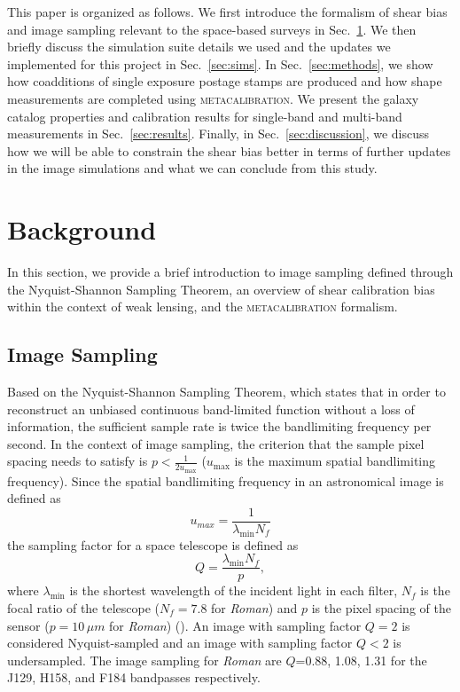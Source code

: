 \documentclass[fleqn,usenatbib]{mnras}
\begin{document}
This paper is organized as follows. We first introduce the formalism of shear bias and image sampling relevant to the space-based surveys in Sec.~\ref{sec:background}. We then briefly discuss the simulation suite details we used and the updates we implemented for this project in Sec.~\ref{sec:sims}. In Sec.~\ref{sec:methods}, we show how coadditions of single exposure postage stamps are produced and how shape measurements are completed using \textsc{metacalibration}. We present the galaxy catalog properties and calibration results for single-band and multi-band measurements in Sec.~\ref{sec:results}. Finally, in Sec.~\ref{sec:discussion}, we discuss how we will be able to constrain the shear bias better in terms of further updates in the image simulations and what we can conclude from this study. 

\section{Background}
\label{sec:background}
In this section, we provide a brief introduction to image sampling defined through the Nyquist-Shannon Sampling Theorem, an overview of shear calibration bias within the context of weak lensing, and the \textsc{metacalibration} formalism.


\subsection{Image Sampling}
Based on the Nyquist-Shannon Sampling Theorem, which states that in order to reconstruct an unbiased continuous band-limited function without a loss of information, the sufficient sample rate is twice the bandlimiting frequency per second. In the context of image sampling, the criterion that the sample pixel spacing needs to satisfy is $p < \frac{1}{2u_{\text{max}}}$ ($u_{\text{max}}$ is the maximum spatial bandlimiting frequency). Since the spatial bandlimiting frequency in an astronomical image is defined as 
\begin{equation}
    u_{max} = \frac{1}{\lambda_{\text{min}}N_{f}}
\end{equation}
the sampling factor for a space telescope is defined as 
\begin{equation}
    Q = \frac{\lambda_{\text{min}}N_{f}}{p}, 
    \label{eqn:sampling}
\end{equation}
where $\lambda_{\text{min}}$ is the shortest wavelength of the incident light in each filter, $N_{f}$ is the focal ratio of the telescope ($N_{f}=7.8$ for \emph{Roman}) and $p$ is the pixel spacing of the sensor ($p=10\,\mu m$ for \emph{Roman}) (\citealt{2013PASP..125.1496S}). An image with sampling factor $Q=2$ is considered Nyquist-sampled and an image with sampling factor $Q<2$ is undersampled. The image sampling for \emph{Roman} are $Q$=0.88, 1.08, 1.31 for the J129, H158, and F184 bandpasses respectively.  
\end{document}
